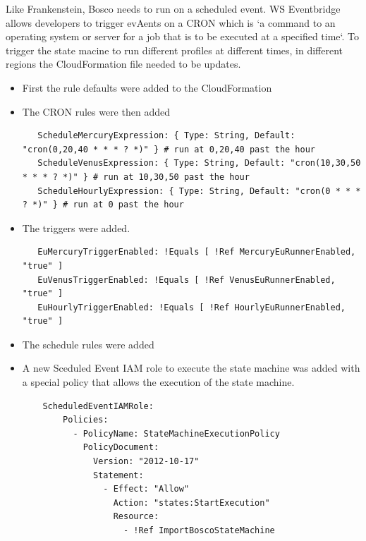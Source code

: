 \documentclass[12pt,a4paper,titlepage]{report}
\begin{document}
Like Frankenstein, Bosco needs to run on a scheduled event. WS Eventbridge allows developers to trigger evAents on a CRON which is `a command to an operating system or server for a job that is to be executed at a specified time`. 
To trigger the state macine to run different profiles at different times, in different regions the  CloudFormation file needed to be updates. 
\begin{itemize}
 \item First the rule defaults were added to the  CloudFormation
 \item The CRON rules were then added 
  \begin{tcolorbox}
   \begin{verbatim}
   ScheduleMercuryExpression: { Type: String, Default: "cron(0,20,40 * * * ? *)" } # run at 0,20,40 past the hour
   ScheduleVenusExpression: { Type: String, Default: "cron(10,30,50 * * * ? *)" } # run at 10,30,50 past the hour
   ScheduleHourlyExpression: { Type: String, Default: "cron(0 * * * ? *)" } # run at 0 past the hour
   \end{verbatim}
  \end{tcolorbox}

 \item The triggers were added.
 \begin{tcolorbox}
  \begin{verbatim}
   EuMercuryTriggerEnabled: !Equals [ !Ref MercuryEuRunnerEnabled, "true" ]
   EuVenusTriggerEnabled: !Equals [ !Ref VenusEuRunnerEnabled, "true" ]
   EuHourlyTriggerEnabled: !Equals [ !Ref HourlyEuRunnerEnabled, "true" ]
  \end{verbatim}
 \end{tcolorbox}
 \item The schedule rules were added
 \item A new Sceduled Event IAM role to execute the state machine was added with a special policy that allows the execution of the state machine. 
 
 \begin{tcolorbox}
  \begin{verbatim}
    ScheduledEventIAMRole:
        Policies:
          - PolicyName: StateMachineExecutionPolicy
            PolicyDocument:
              Version: "2012-10-17"
              Statement:
                - Effect: "Allow"
                  Action: "states:StartExecution"
                  Resource:
                    - !Ref ImportBoscoStateMachine
  \end{verbatim}
 \end{tcolorbox}
\end{itemize}
\end{document}

